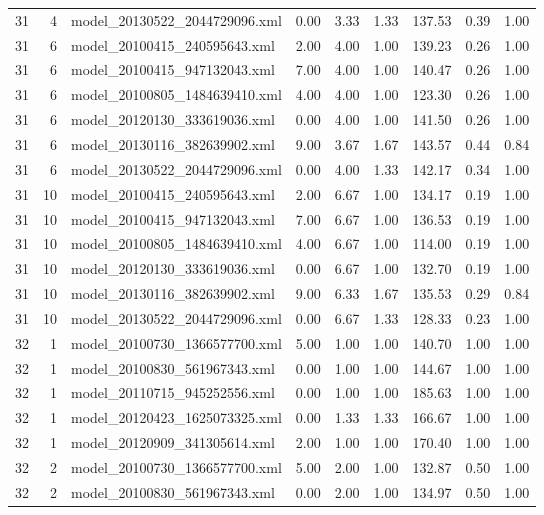 \begin{table}[ht]
\begin{tabular}{rrlrrrrrr}
   31 &   4 & model\_20130522\_2044729096.xml & 0.00 & 3.33 & 1.33 & 137.53 & 0.39 & 1.00 \\ 
   31 &   6 & model\_20100415\_240595643.xml & 2.00 & 4.00 & 1.00 & 139.23 & 0.26 & 1.00 \\ 
   31 &   6 & model\_20100415\_947132043.xml & 7.00 & 4.00 & 1.00 & 140.47 & 0.26 & 1.00 \\ 
   31 &   6 & model\_20100805\_1484639410.xml & 4.00 & 4.00 & 1.00 & 123.30 & 0.26 & 1.00 \\ 
   31 &   6 & model\_20120130\_333619036.xml & 0.00 & 4.00 & 1.00 & 141.50 & 0.26 & 1.00 \\ 
   31 &   6 & model\_20130116\_382639902.xml & 9.00 & 3.67 & 1.67 & 143.57 & 0.44 & 0.84 \\ 
   31 &   6 & model\_20130522\_2044729096.xml & 0.00 & 4.00 & 1.33 & 142.17 & 0.34 & 1.00 \\ 
   31 &  10 & model\_20100415\_240595643.xml & 2.00 & 6.67 & 1.00 & 134.17 & 0.19 & 1.00 \\ 
   31 &  10 & model\_20100415\_947132043.xml & 7.00 & 6.67 & 1.00 & 136.53 & 0.19 & 1.00 \\ 
   31 &  10 & model\_20100805\_1484639410.xml & 4.00 & 6.67 & 1.00 & 114.00 & 0.19 & 1.00 \\ 
   31 &  10 & model\_20120130\_333619036.xml & 0.00 & 6.67 & 1.00 & 132.70 & 0.19 & 1.00 \\ 
   31 &  10 & model\_20130116\_382639902.xml & 9.00 & 6.33 & 1.67 & 135.53 & 0.29 & 0.84 \\ 
   31 &  10 & model\_20130522\_2044729096.xml & 0.00 & 6.67 & 1.33 & 128.33 & 0.23 & 1.00 \\ 
   32 &   1 & model\_20100730\_1366577700.xml & 5.00 & 1.00 & 1.00 & 140.70 & 1.00 & 1.00 \\ 
   32 &   1 & model\_20100830\_561967343.xml & 0.00 & 1.00 & 1.00 & 144.67 & 1.00 & 1.00 \\ 
   32 &   1 & model\_20110715\_945252556.xml & 0.00 & 1.00 & 1.00 & 185.63 & 1.00 & 1.00 \\ 
   32 &   1 & model\_20120423\_1625073325.xml & 0.00 & 1.33 & 1.33 & 166.67 & 1.00 & 1.00 \\ 
   32 &   1 & model\_20120909\_341305614.xml & 2.00 & 1.00 & 1.00 & 170.40 & 1.00 & 1.00 \\ 
   32 &   2 & model\_20100730\_1366577700.xml & 5.00 & 2.00 & 1.00 & 132.87 & 0.50 & 1.00 \\ 
   32 &   2 & model\_20100830\_561967343.xml & 0.00 & 2.00 & 1.00 & 134.97 & 0.50 & 1.00 \\ 

\end{tabular}
\end{table}
